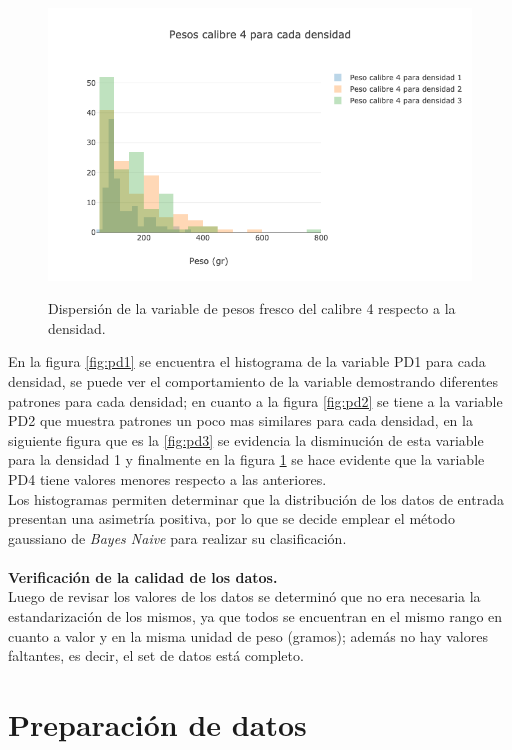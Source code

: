 \begin{figure}[h!]
	\caption{Dispersión de la variable de pesos fresco del calibre 4 respecto a la densidad.}
	\centering
	\includegraphics[scale=0.6]{PD4.png}
	\label{fig:pd4}
\end{figure}

En la figura \ref{fig:pd1} se encuentra el histograma de la variable PD1 para cada densidad, se puede ver el comportamiento de la variable demostrando diferentes patrones para cada densidad; en cuanto a la figura \ref{fig:pd2} se tiene a la variable PD2 que muestra patrones un poco mas similares para cada densidad, en la siguiente figura que es la \ref{fig:pd3} se evidencia la disminución de esta variable para la densidad 1 y finalmente en la figura \ref{fig:pd4} se hace evidente que la variable PD4 tiene valores menores respecto a las anteriores.\\

Los histogramas permiten determinar que la distribución de los datos de entrada presentan  una asimetría positiva, por lo que se decide  emplear el método gaussiano de \textit{Bayes Naive} para realizar su clasificación.\\\\

\noindent
\textbf{Verificación de la calidad de los datos.}\\

Luego de revisar los valores de los datos se determinó que no era necesaria la estandarización de los mismos, ya que todos se encuentran en el mismo rango en cuanto a valor y en la misma unidad de peso (gramos); además no hay valores faltantes, es decir, el set de datos está completo.

\section{Preparación de datos}

